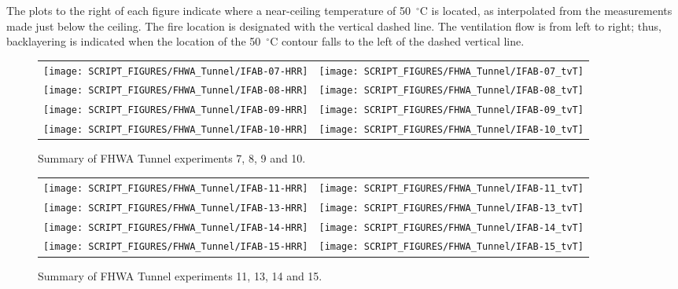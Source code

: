 The plots to the right of each figure indicate where a near-ceiling temperature of 50~$^\circ$C is located, as interpolated from the measurements made just below the ceiling. The fire location is designated with the vertical dashed line. The ventilation flow is from left to right; thus, backlayering is indicated when the location of the 50~$^\circ$C contour falls to the left of the dashed vertical line.

\newpage

\begin{figure}[p]
\begin{tabular*}{\textwidth}{l@{\extracolsep{\fill}}r}
\texttt{[image: SCRIPT\_FIGURES/FHWA\_Tunnel/IFAB-07-HRR]} &
\texttt{[image: SCRIPT\_FIGURES/FHWA\_Tunnel/IFAB-07\_tvT]} \\
\texttt{[image: SCRIPT\_FIGURES/FHWA\_Tunnel/IFAB-08-HRR]} &
\texttt{[image: SCRIPT\_FIGURES/FHWA\_Tunnel/IFAB-08\_tvT]} \\
\texttt{[image: SCRIPT\_FIGURES/FHWA\_Tunnel/IFAB-09-HRR]} &
\texttt{[image: SCRIPT\_FIGURES/FHWA\_Tunnel/IFAB-09\_tvT]} \\
\texttt{[image: SCRIPT\_FIGURES/FHWA\_Tunnel/IFAB-10-HRR]} &
\texttt{[image: SCRIPT\_FIGURES/FHWA\_Tunnel/IFAB-10\_tvT]}
\end{tabular*}
\caption[Summary of FHWA Tunnel experiments 7, 8, 9 and 10]{Summary of FHWA Tunnel experiments 7, 8, 9 and 10.}
\label{FHWA_Tunnel_Results_1}
\end{figure}

\begin{figure}[p]
\begin{tabular*}{\textwidth}{l@{\extracolsep{\fill}}r}
\texttt{[image: SCRIPT\_FIGURES/FHWA\_Tunnel/IFAB-11-HRR]} &
\texttt{[image: SCRIPT\_FIGURES/FHWA\_Tunnel/IFAB-11\_tvT]} \\
\texttt{[image: SCRIPT\_FIGURES/FHWA\_Tunnel/IFAB-13-HRR]} &
\texttt{[image: SCRIPT\_FIGURES/FHWA\_Tunnel/IFAB-13\_tvT]} \\
\texttt{[image: SCRIPT\_FIGURES/FHWA\_Tunnel/IFAB-14-HRR]} &
\texttt{[image: SCRIPT\_FIGURES/FHWA\_Tunnel/IFAB-14\_tvT]} \\
\texttt{[image: SCRIPT\_FIGURES/FHWA\_Tunnel/IFAB-15-HRR]} &
\texttt{[image: SCRIPT\_FIGURES/FHWA\_Tunnel/IFAB-15\_tvT]}
\end{tabular*}
\caption[Summary of FHWA Tunnel experiments 11, 13, 14 and 15]{Summary of FHWA Tunnel experiments 11, 13, 14 and 15.}
\label{FHWA_Tunnel_Results_2}
\end{figure}

